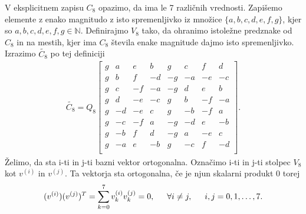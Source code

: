 \documentclass[a4paper,12pt,openright]{book}
\begin{document}

V eksplicitnem zapisu $C_8$ opazimo, da ima le 7 različnih vrednosti. Zapišemo elemente z enako magnitudo z isto spremenljivko iz množice $\{a,b,c,d,e,f,g\}$, kjer so $a,b,c,d,e,f,g \in \mathbb{N}$. Definirajmo $V_8$ tako, da ohranimo istoležne predznake od $C_8$ in na mestih, kjer ima $C_8$ števila enake magnitude dajmo isto spremenljivko. Izrazimo $\widetilde{C_8}$ po tej definiciji
\begin{gather}
   \widetilde{C_8} = Q_8
 \begin{bmatrix}
    g&  a&  e&  b&  g&  c&  f&  d\\
    g&  b&  f& -d& -g& -a& -e& -c\\
    g&  c& -f& -a& -g&  d&  e&  b\\
    g&  d& -e& -c&  g&  b& -f& -a\\
    g& -d& -e&  c&  g& -b& -f&  a\\
    g& -c& -f&  a& -g& -d&  e& -b\\
    g& -b&  f&  d& -g&  a& -e&  c\\
    g& -a&  e& -b&  g& -c&  f& -d\\
 \end{bmatrix}.
\label{eq:IntegerDCT_Q8}
\end{gather}
Želimo, da sta i-ti in j-ti bazni vektor ortogonalna. Označimo i-ti in j-ti stolpec $V_8$ kot $v^{(i)} $ in $v^{(j)}$. Ta vektorja sta ortogonalna, če je njun skalarni produkt 0 torej
\begin{equation*}
    (v^{(i)}) (v^{(j)})^T = \sum_{k=0}^7v^{(i)}_{k}v^{(j)}_{k} = 0,\indent \forall i \neq j, \indent i,j = 0,1,\ldots,7.
\end{equation*}
\end{document}
